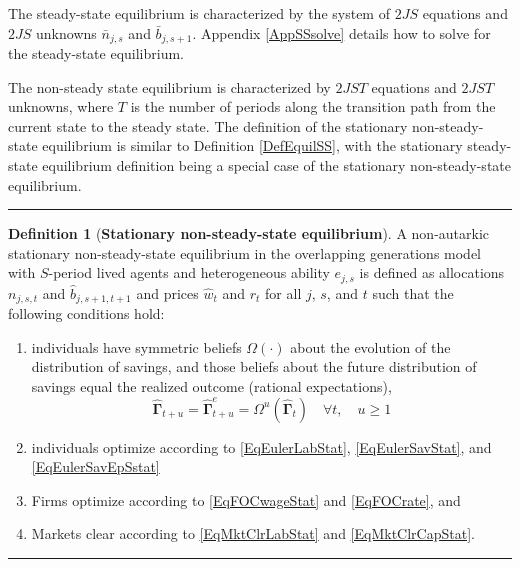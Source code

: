 \documentclass[letterpaper,12pt]{article}
\theoremstyle{definition}
\newtheorem{definition}{Definition} %
\begin{document}
    \begin{spacing}{1.5}
    \vspace{10mm}

    The steady-state equilibrium is characterized by the system of $2JS$ equations and $2JS$ unknowns $\bar{n}_{j,s}$ and $\bar{b}_{j,s+1}$. Appendix \ref{AppSSsolve} details how to solve for the steady-state equilibrium.

    The non-steady state equilibrium is characterized by $2JST$ equations and $2JST$ unknowns, where $T$ is the number of periods along the transition path from the current state to the steady state.  The definition of the stationary non-steady-state equilibrium is similar to Definition \ref{DefEquilSS}, with the stationary steady-state equilibrium definition being a special case of the stationary non-steady-state equilibrium.

    \vspace{7mm}

    \hrule
    \begin{definition}[\textbf{Stationary non-steady-state equilibrium}]\label{DefEquilNonSS}
      A non-autarkic stationary non-steady-state equilibrium in the overlapping generations model with $S$-period lived agents and heterogeneous ability $e_{j,s}$ is defined as allocations $n_{j,s,t}$ and $\hat{b}_{j,s+1,t+1}$ and prices $\hat{w}_t$ and $r_t$ for all $j$, $s$, and $t$ such that the following conditions hold:
       \begin{enumerate}
          \item individuals have symmetric beliefs $\Omega(\cdot)$ about the evolution of the distribution of savings, and those beliefs about the future distribution of savings equal the realized outcome (rational expectations),
            \begin{equation*}
              \bm{\hat{\Gamma}}_{t+u} = \bm{\hat{\Gamma}}^e_{t+u} = \Omega^u\left( \bm{\hat{\Gamma}}_t\right) \quad\forall t, \quad u\geq 1
            \end{equation*}
          \item individuals optimize according to \eqref{EqEulerLabStat}, \eqref{EqEulerSavStat}, and \eqref{EqEulerSavEpSstat}
          \item Firms optimize according to \eqref{EqFOCwageStat} and \eqref{EqFOCrate}, and
          \item Markets clear according to \eqref{EqMktClrLabStat} and \eqref{EqMktClrCapStat}.
       \end{enumerate}
    \end{definition}
    \hrule


\end{spacing}
\end{document}
